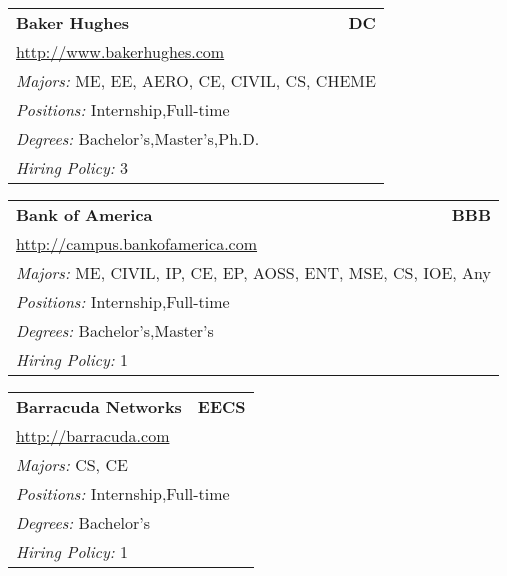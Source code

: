 \documentclass[twoside]{article}
\begin{document}
\begin{center}
\begin{multicols}{3}
\begin{FlushLeft}
\begin{minipage}{.9\columnwidth}
\end{minipage}
 
\begin{minipage}{.9\columnwidth}\begin{tabularx}{.95\columnwidth}{Xr}
                 {\Large\bf Baker Hughes} & {\Large\bf DC}\\
    \multicolumn{2}{p{.95\columnwidth}}{\url{http://www.bakerhughes.com}}\\
    \multicolumn{2}{p{.95\columnwidth}}{\emph{Majors:} ME, EE, AERO, CE, CIVIL, CS, CHEME}\\
    \multicolumn{2}{p{.95\columnwidth}}{\emph{Positions:} Internship,Full-time}\\
    \multicolumn{2}{p{.95\columnwidth}}{\emph{Degrees:} Bachelor's,Master's,Ph.D.}\\
    \multicolumn{2}{p{.95\columnwidth}}{\emph{Hiring Policy:} 3}\\
    \end{tabularx}
    
\end{minipage}
 
\begin{minipage}{.9\columnwidth}\begin{tabularx}{.95\columnwidth}{Xr}
                 {\Large\bf Bank of America} & {\Large\bf BBB}\\
    \multicolumn{2}{p{.95\columnwidth}}{\url{http://campus.bankofamerica.com}}\\
    \multicolumn{2}{p{.95\columnwidth}}{\emph{Majors:} ME, CIVIL, IP, CE, EP, AOSS, ENT, MSE, CS, IOE, Any}\\
    \multicolumn{2}{p{.95\columnwidth}}{\emph{Positions:} Internship,Full-time}\\
    \multicolumn{2}{p{.95\columnwidth}}{\emph{Degrees:} Bachelor's,Master's}\\
    \multicolumn{2}{p{.95\columnwidth}}{\emph{Hiring Policy:} 1}\\
    \end{tabularx}
    
\end{minipage}
 
\begin{minipage}{.9\columnwidth}\begin{tabularx}{.95\columnwidth}{Xr}
                 {\Large\bf Barracuda Networks} & {\Large\bf EECS}\\
    \multicolumn{2}{p{.95\columnwidth}}{\url{http://barracuda.com}}\\
    \multicolumn{2}{p{.95\columnwidth}}{\emph{Majors:} CS, CE}\\
    \multicolumn{2}{p{.95\columnwidth}}{\emph{Positions:} Internship,Full-time}\\
    \multicolumn{2}{p{.95\columnwidth}}{\emph{Degrees:} Bachelor's}\\
    \multicolumn{2}{p{.95\columnwidth}}{\emph{Hiring Policy:} 1}\\
    \end{tabularx}
    

\end{minipage}
\end{FlushLeft}
\end{multicols}
\end{center}
\end{document}
